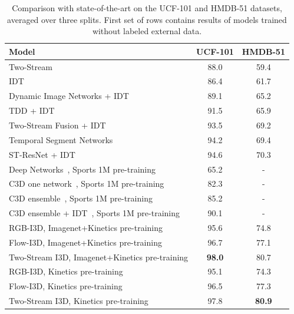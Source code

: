 \documentclass[10pt,twocolumn,letterpaper]{article}
\begin{document}
\begin{table}[h]
\begin{center}
    \begin{tabular}{| l | c | c |}
    \hline
    Model & UCF-101 & HMDB-51  \\ \hline\hline
    Two-Stream~\cite{simonyan2014two} & 88.0 & 59.4 \\ \hline
    IDT~\cite{wangICCV13} & 86.4 & 61.7 \\ \hline
    Dynamic Image Networks + IDT~\cite{bilen2016dynamic} & 89.1 & 65.2 \\ \hline
    TDD + IDT~\cite{wang2015action} & 91.5 & 65.9 \\ \hline
    Two-Stream Fusion + IDT~\cite{feichtenhofer2016convolutional} & 93.5 & 69.2\\ \hline
    Temporal Segment Networks~\cite{wang2016temporal} & 94.2  &  69.4 \\ \hline
    ST-ResNet + IDT~\cite{feichtenhofer2016spatiotemporal} & 94.6 & 70.3  \\ \hline 
    \hline
    Deep Networks~\cite{karpathy2014large}, Sports 1M pre-training & 65.2 & -  \\ \hline
    C3D one network~\cite{tran2015learning}, Sports 1M pre-training & 82.3 & -  \\ \hline
    C3D ensemble~\cite{tran2015learning}, Sports 1M pre-training  & 85.2 & - \\ \hline
    C3D ensemble + IDT~\cite{tran2015learning}, Sports 1M pre-training  & 90.1 & - \\ \hline
    \hline
    RGB-I3D,     Imagenet+Kinetics pre-training & 95.6 & 74.8   \\ \hline
    Flow-I3D,     Imagenet+Kinetics pre-training & 96.7 & 77.1   \\ \hline
    Two-Stream I3D,     Imagenet+Kinetics pre-training & \textbf{98.0} & 80.7   \\ \hline
    RGB-I3D,     Kinetics pre-training & 95.1 & 74.3   \\ \hline
    Flow-I3D,     Kinetics pre-training & 96.5 & 77.3   \\ \hline
    Two-Stream I3D,     Kinetics pre-training & 97.8 & \textbf{80.9}   \\ \hline


    \hline
    \end{tabular}
\end{center}
\caption{
Comparison with state-of-the-art on the  UCF-101 and HMDB-51 datasets, averaged over three splits. First set of rows
contains results of models trained without labeled external data.}
\label{fig:state-of-the-art}
\end{table}
\end{document}
